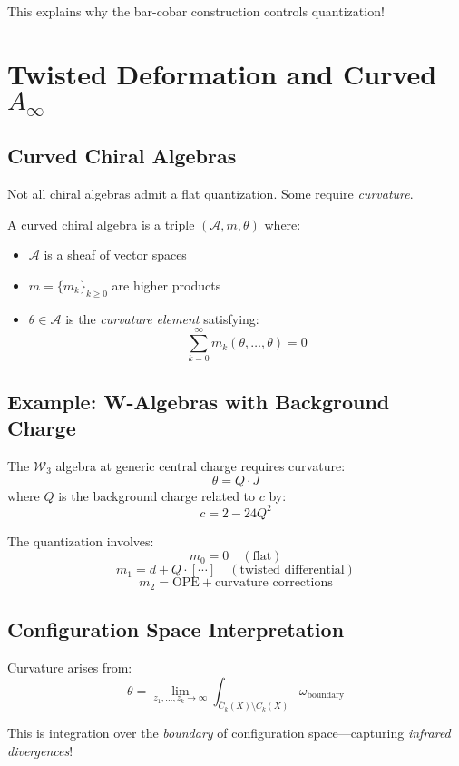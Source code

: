 This explains why the bar-cobar construction controls quantization!

\section{Twisted Deformation and Curved $A_\infty$}

\subsection{Curved Chiral Algebras}

Not all chiral algebras admit a flat quantization. Some require \emph{curvature}.

\begin{definition}
A curved chiral algebra is a triple $(\mathcal{A}, m, \theta)$ where:
\begin{itemize}
\item $\mathcal{A}$ is a sheaf of vector spaces
\item $m = \{m_k\}_{k \geq 0}$ are higher products
\item $\theta \in \mathcal{A}$ is the \emph{curvature element} satisfying:
$$\sum_{k=0}^\infty m_k(\theta, \ldots, \theta) = 0$$
\end{itemize}
\end{definition}

\subsection{Example: W-Algebras with Background Charge}

The $\mathcal{W}_3$ algebra at generic central charge requires curvature:
$$\theta = Q \cdot J$$
where $Q$ is the background charge related to $c$ by:
$$c = 2 - 24Q^2$$

The quantization involves:
$$m_0 = 0 \quad (\text{flat})$$
$$m_1 = d + Q \cdot [\cdots] \quad (\text{twisted differential})$$
$$m_2 = \text{OPE} + \text{curvature corrections}$$

\subsection{Configuration Space Interpretation}

Curvature arises from:
$$\theta = \lim_{z_1, \ldots, z_k \to \infty} \int_{\overline{C}_k(X) \setminus C_k(X)} \omega_{\text{boundary}}$$

This is integration over the \emph{boundary} of configuration space—capturing \emph{infrared divergences}!

